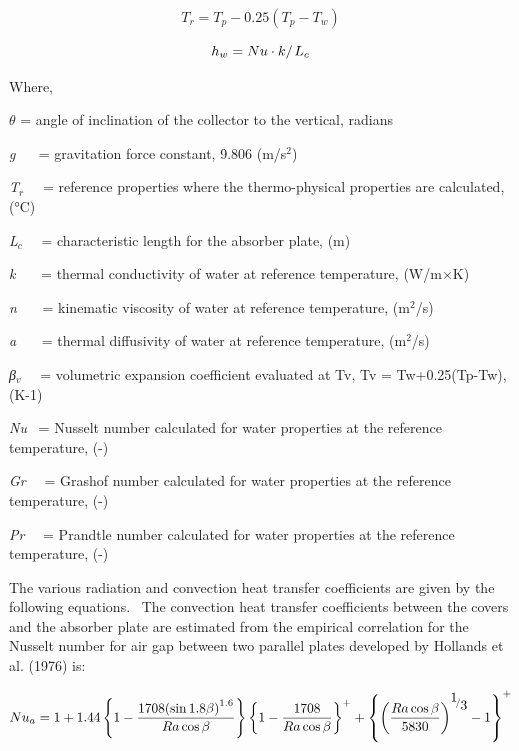 \begin{equation}
{T_r} = {T_p} - 0.25\left( {{T_p} - {T_w}} \right)
\end{equation}

\begin{equation}
{h_w} = {{Nu \cdot k} \mathord{\left/ {\vphantom {{Nu \cdot k} {{L_c}}}} \right. } {{L_c}}}
\end{equation}

Where,

\(\theta\) = angle of inclination of the collector to the vertical, radians

\emph{g} ~~ = gravitation force constant, 9.806 (m/s\(^{2}\))

\emph{T\(_{r}\)}~~ = reference properties where the thermo-physical properties are calculated, (°C)

\emph{L\(_{c}\)}~~ = characteristic length for the absorber plate, (m)

\emph{k}~~~ = thermal conductivity of water at reference temperature, (W/m×K)

\emph{n}~~~ = kinematic viscosity of water at reference temperature, (m\(^{2}\)/s)

\emph{a}~~~ = thermal diffusivity of water at reference temperature, (m\(^{2}\)/s)

\emph{β\(_{v}\)}~~ = volumetric expansion coefficient evaluated at Tv, Tv = Tw+0.25(Tp-Tw), (K-1)

\emph{Nu}~ = Nusselt number calculated for water properties at the reference temperature, (-)

\emph{Gr}~~ = Grashof number calculated for water properties at the reference temperature, (-)

\emph{Pr}~~ = Prandtle number calculated for water properties at the reference temperature, (-)

The various radiation and convection heat transfer coefficients are given by the following equations.~ The convection heat transfer coefficients between the covers and the absorber plate are estimated from the empirical correlation for the Nusselt number for air gap between two parallel plates developed by Hollands et al. (1976) is:

\begin{equation}
N{u_a} = 1 + 1.44\left\{ {1 - \frac{{1708{{\left( {\sin 1.8\beta } \right)}^{1.6}}}}{{Ra\cos \beta }}} \right\}{\left\{ {1 - \frac{{1708}}{{Ra\cos \beta }}} \right\}^ + } + {\left\{ {{{\left( {\frac{{Ra\cos \beta }}{{5830}}} \right)}^{{\raise0.7ex\hbox{1} \!\mathord{\left/ {\vphantom {1 3}}\right.}\!\lower0.7ex\hbox{3}}}} - 1} \right\}^ + }
\end{equation}

